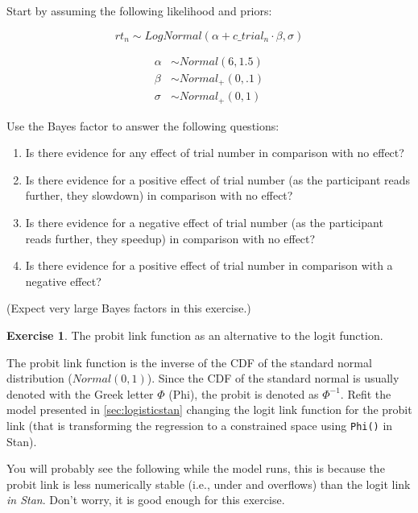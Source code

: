 \documentclass[12pt,]{krantz}
\providecommand{\tightlist}{%
  \setlength{\itemsep}{0pt}\setlength{\parskip}{0pt}}
\theoremstyle{definition}
\theoremstyle{definition}
\theoremstyle{definition}
\newtheorem{exercise}{Exercise}[chapter]
\theoremstyle{remark}
\begin{document}
Start by assuming the following likelihood and priors:

\begin{equation}
rt_n \sim LogNormal(\alpha + c\_trial_n \cdot \beta,\sigma)
\end{equation}

\begin{equation}
\begin{aligned}
\alpha &\sim Normal(6, 1.5) \\
\beta &\sim Normal_+(0, .1)\\
\sigma &\sim Normal_+(0, 1)
\end{aligned}
\end{equation}

Use the Bayes factor to answer the following questions:

\begin{enumerate}
\def\labelenumi{\alph{enumi}.}
\tightlist
\item
  Is there evidence for any effect of trial number in comparison with no effect?
\item
  Is there evidence for a positive effect of trial number (as the participant reads further, they slowdown) in comparison with no effect?
\item
  Is there evidence for a negative effect of trial number (as the participant reads further, they speedup) in comparison with no effect?
\item
  Is there evidence for a positive effect of trial number in comparison with a negative effect?
\end{enumerate}

(Expect very large Bayes factors in this exercise.)

\begin{exercise}
\protect\hypertarget{exr:linkfunction}{}{\label{exr:linkfunction} }The probit link function as an alternative to the logit function.
\end{exercise}

The probit link function is the inverse of the CDF of the standard normal distribution (\(Normal(0,1)\)). Since the CDF of the standard normal is usually denoted with the Greek letter \(\Phi\) (Phi), the probit is denoted as \(\Phi^{-1}\). Refit the model presented in \ref{sec:logisticstan} changing the logit link function for the probit link (that is transforming the regression to a constrained space using \texttt{Phi()} in Stan).

You will probably see the following while the model runs, this is because the probit link is less numerically stable (i.e., under and overflows) than the logit link \emph{in Stan}. Don't worry, it is good enough for this exercise.
\end{document}
